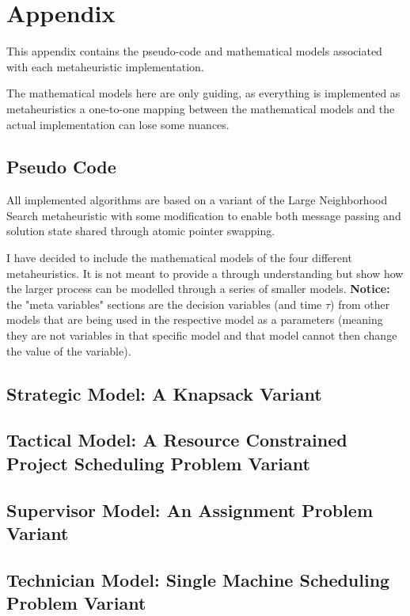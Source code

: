 \newpage
\section*{Appendix}
This appendix contains the pseudo-code and mathematical models associated with each metaheuristic implementation. 

The mathematical models here are only guiding, as everything is implemented as metaheuristics a one-to-one mapping
between the mathematical models and the actual implementation can lose some nuances.

\subsection*{Pseudo Code}

All implemented algorithms are based on a variant of the Large Neighborhood Search metaheuristic with some modification to enable both message
passing and solution state shared through atomic pointer swapping. 

\begin{figure}[H]
	
\end{figure}

I have decided to include the mathematical models of the four different metaheuristics. It is not meant to provide a through understanding
but show how the larger process can be modelled through a series of smaller models. \textbf{Notice:} the "meta variables" sections are
the decision variables (and time $\tau$) from other models that are being used in the respective model as a parameters (meaning they are 
not variables in that specific model and that model cannot then change the value of the variable).

\newpage
\subsection*{Strategic Model: A Knapsack Variant}

\newpage
\subsection*{Tactical Model: A Resource Constrained Project Scheduling Problem Variant}

\newpage
\subsection*{Supervisor Model: An Assignment Problem Variant}

\newpage
\subsection*{Technician Model: Single Machine Scheduling Problem Variant}

